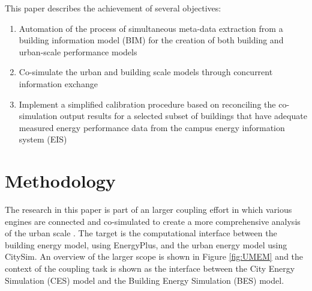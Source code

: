 \documentclass{tBPS2e}
\theoremstyle{plain}
\theoremstyle{definition}
\theoremstyle{remark}
\begin{document}
This paper describes the achievement of several objectives:
\begin{enumerate}
  \item Automation of the process of simultaneous meta-data extraction from a building information model (BIM) for the creation of both building and urban-scale performance models \cite{Thomas:2012wj,Schlueter2009}
  \item Co-simulate the urban and building scale models through concurrent information exchange \cite{thomas2014multiscale}
  \item Implement a simplified calibration procedure based on reconciling the co-simulation output results for a selected subset of buildings that have adequate measured energy performance data from the campus energy information system (EIS) \cite{Samuelson:2015jg,Miller:tg}
\end{enumerate} 



\section{Methodology}
The research in this paper is part of an larger coupling effort in which various engines are connected and co-simulated to create a more comprehensive analysis of the urban scale \citep{Dorer:2013vt}. The target is the computational interface between the building energy model, using EnergyPlus, and the urban energy model using CitySim. An overview of the larger scope is shown in Figure \ref{fig:UMEM} and the context of the coupling task is shown as the interface between the City Energy Simulation (CES) model and the Building Energy Simulation (BES) model. 
\end{document}
